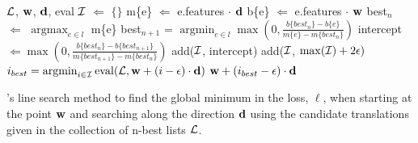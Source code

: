 \documentclass[11pt]{article}
\DeclareMathOperator*{\argmax}{argmax}
\DeclareMathOperator*{\argmin}{argmin}
\DeclareMathOperator*{\eval}{eval}
\begin{document}
\begin{algorithm}[tb]
\begin{algorithmic}
    \mbox{${\cal L}$}, \mbox{${\bf w}$}, \mbox{${\bf d}$}, eval
   \STATE \mbox{${\cal I}$} \mbox{$\Leftarrow$} \mbox{$\{\}$}
         \STATE m\{e\} \mbox{$\Leftarrow$} e.features \mbox{$\cdot$} \mbox{${\bf d}$}
         \STATE b\{e\} \mbox{$\Leftarrow$} e.features \mbox{$\cdot$} \mbox{${\bf w}$}
     \ENDFOR
     \STATE best\mbox{$_n$} \mbox{$\Leftarrow$} \mbox{$\argmax_{e\in l}$} m\{e\}
     \LOOP
       \STATE best\mbox{$_{n+1}$} = $\argmin_{e\in l}
                  \max\left(0,\frac{b\{best_n\}-b\{e\}}{m\{e\}-m\{best_n\}}\right )$
       \STATE intercept \mbox{$\Leftarrow \max\left(0,\frac{b\{best_n\}-b\{best_{n+1}\}}{m\{best_{n+1}\}-m\{best_n\}}\right )$}
         \STATE add(\mbox{${\cal I}$}, intercept)
       \ELSE
       \ENDIF
     \ENDLOOP
   \ENDFOR
   \STATE add(\mbox{${\cal I}$}, \mbox{$\max({\cal I})+2\epsilon)$}
   \STATE \mbox{$i_{best} = \argmin_{i \in {\cal I}} \eval({\cal L},{\bf w}+(i-\epsilon) \cdot {\bf d})$}
    \mbox{${\bf w}+(i_{best}-\epsilon) \cdot {\bf d}$}
\caption{
's line search method to find the global minimum in the loss, \mbox{${\ell}$}, when starting at the point \mbox{${\bf w}$} and searching along the direction \mbox{${\bf d}$} using the candidate translations given in the collection of n-best lists \mbox{${\cal L}$}.
\label{mertlinesearchalg}
}
\end{algorithmic}
\end{algorithm}
\end{document}
